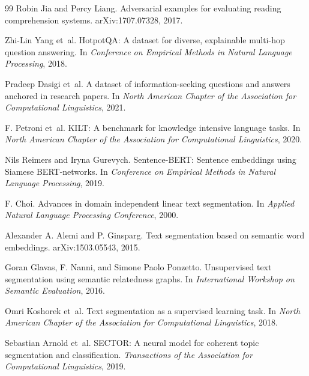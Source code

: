\documentclass[10pt]{article}
\begin{document}
\begin{thebibliography}{99}
Robin Jia and Percy Liang.
\newblock Adversarial examples for evaluating reading comprehension systems.
\newblock arXiv:1707.07328, 2017.

Zhi-Lin Yang et~al.
\newblock HotpotQA: A dataset for diverse, explainable multi-hop question answering.
\newblock In \emph{Conference on Empirical Methods in Natural Language Processing}, 2018.

Pradeep Dasigi et~al.
\newblock A dataset of information-seeking questions and answers anchored in research papers.
\newblock In \emph{North American Chapter of the Association for Computational Linguistics}, 2021.

F. Petroni et~al.
\newblock KILT: A benchmark for knowledge intensive language tasks.
\newblock In \emph{North American Chapter of the Association for Computational Linguistics}, 2020.

Nils Reimers and Iryna Gurevych.
\newblock Sentence-BERT: Sentence embeddings using Siamese BERT-networks.
\newblock In \emph{Conference on Empirical Methods in Natural Language Processing}, 2019.

F. Choi.
\newblock Advances in domain independent linear text segmentation.
\newblock In \emph{Applied Natural Language Processing Conference}, 2000.

Alexander A. Alemi and P. Ginsparg.
\newblock Text segmentation based on semantic word embeddings.
\newblock arXiv:1503.05543, 2015.

Goran Glavas, F. Nanni, and Simone Paolo Ponzetto.
\newblock Unsupervised text segmentation using semantic relatedness graphs.
\newblock In \emph{International Workshop on Semantic Evaluation}, 2016.

Omri Koshorek et~al.
\newblock Text segmentation as a supervised learning task.
\newblock In \emph{North American Chapter of the Association for Computational Linguistics}, 2018.

Sebastian Arnold et~al.
\newblock SECTOR: A neural model for coherent topic segmentation and classification.
\newblock \emph{Transactions of the Association for Computational Linguistics}, 2019.


\end{thebibliography}
\end{document}

